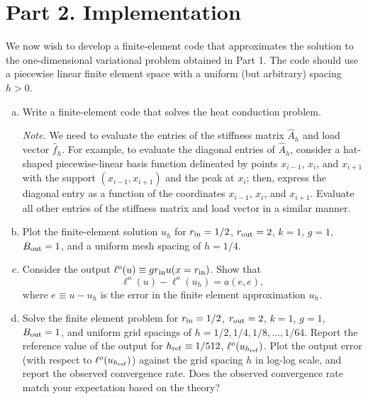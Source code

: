 \documentclass[preprint,11pt]{article}
\begin{document}
\section*{Part 2. Implementation}
We now wish to develop a finite-element code that approximates the solution to the one-dimensional variational problem obtained in Part 1. The code should use a piecewise linear finite element space with a uniform (but arbitrary) spacing $h > 0$.%
\begin{enumerate}[(a)]
\item Write a finite-element code that solves the heat conduction problem.

  \emph{Note.} We need to evaluate the entries of the stiffness matrix $\hat A_h$ and load vector $\hat f_h$.  For example, to evaluate the diagonal entries of $\hat A_h$, consider a hat-shaped piecewise-linear basis function delineated by points $x_{i-1}$, $x_i$, and $x_{i+1}$ with the support $(x_{i-1},x_{i+1})$ and the peak at $x_i$; then, express the diagonal entry as a function of the coordinates $x_{i-1}$, $x_{i}$, and $x_{i+1}$.  Evaluate all other entries of the stiffness matrix and load vector in a similar manner. 
\item Plot the finite-element solution $u_h$ for $r_{\rm in} = 1/2$, $r_{\rm out} = 2$, $k = 1$, $g = 1$, $B_{\rm out} = 1$, and a uniform mesh spacing of $h = 1/4$.  
\item Consider the output $\ell^{o}(u) \equiv g r_{\rm in} u(x = r_{\rm in})$. Show that
  \begin{equation*}
    \ell^o(u) - \ell^o(u_h) = a(e,e),
  \end{equation*}
  where $e \equiv u - u_h$ is the error in the finite element approximation $u_h$.  
\item Solve the finite element problem for $r_{\rm in} = 1/2$, $r_{\rm out} = 2$, $k = 1$, $g = 1$, $B_{\rm out} = 1$, and uniform grid spacings of $h = 1/2, 1/4, 1/8, \dots, 1/64$. Report the reference value of the output for $h_{\rm ref} \equiv 1/512$, $\ell^o(u_{h_{\rm ref}})$.  Plot the output error (with respect to $\ell^o(u_{h_{\rm ref}})$) against the grid spacing $h$ in log-log scale, and report the observed convergence rate.  Does the observed convergence rate match your expectation based on the theory?
\end{enumerate}
\end{document}
